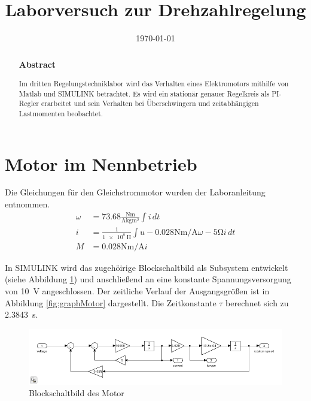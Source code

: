 \documentclass[
    paper=a4,
    fontsize=10pt,
    DIV=12,
    oneside,
]{scrartcl}
\title{Laborversuch zur Drehzahlregelung}
\date{\today}
\begin{document}
\maketitle

\begin{abstract}
    \noindent    
    \subsubsection*{Abstract}
        Im dritten Regelungstechniklabor wird das Verhalten eines Elektromotors mithilfe von Matlab und SIMULINK betrachtet. Es wird ein stationär genauer Regelkreis als PI-Regler erarbeitet und sein Verhalten bei Überschwingern und zeitabhängigen Lastmomenten beobachtet.
\end{abstract}


\section{Motor im Nennbetrieb}
    Die Gleichungen für den Gleichstrommotor wurden der Laboranleitung \cite{versuch3} entnommen. 
    \begin{align}
        \omega  &= 73.68 \frac{\si{\newton\meter}}{\si{\ampere\kilogram\metre\squared}} \int i \, dt\\
        i       &= \frac{1}{\SI{1e8}{\henry}} \int u - 0.028 \si{\newton\meter\per\ampere} \omega - 5 \si{\ohm} i \, dt\\
        M       &= 0.028 \si{\newton\meter\per\ampere} i
    \end{align}
    
    In SIMULINK wird das zugehöirige Blockschaltbild als Subsystem entwickelt (siehe Abbildung \ref{fig:blockMotor}) und anschließend an eine konstante Spannungsversorgung von \SI{10}{\volt} angeschlossen. Der zeitliche Verlauf der Ausgangsgrößen ist in Abbildung \ref{fig:graphMotor} dargestellt. Die Zeitkonstante \(\tau\) berechnet sich zu \SI{2.3843}{\second}.

    \begin{figure}[hbt]
        \centering
        \includegraphics[width=1.3\imagewidth]{../versuch3/blockMotor}
        \caption{Blockschaltbild des Motor}
        \label{fig:blockMotor}
    \end{figure}   
\end{document}
